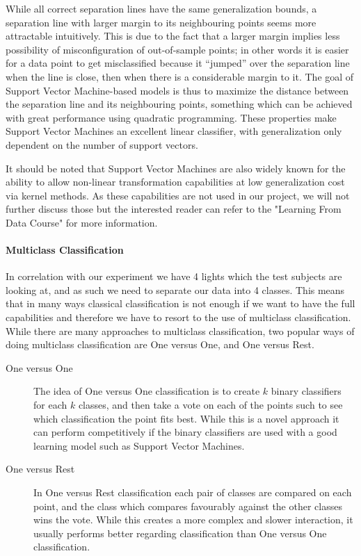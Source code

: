 While all correct separation lines have the same generalization bounds, a separation line with larger margin to its neighbouring points seems more attractable intuitively.
This is due to the fact that a larger margin implies less possibility of misconfiguration of out-of-sample points; in other words it is easier for a data point to get
misclassified because it ``jumped'' over the separation line when the line is close, then when there is a considerable margin to it.
The goal of Support Vector Machine-based models is thus to maximize the distance between the separation line and its neighbouring points,
something which can be achieved with great performance using quadratic programming\cite{learningfromdata2012course}\cite{frank2006algorithm}. 
These properties make Support Vector Machines an excellent linear classifier, with generalization only dependent on the number of support vectors.

It should be noted that Support Vector Machines are also widely known for the ability
to allow non-linear transformation capabilities at low generalization cost via kernel methods. As these capabilities are not used in our project, we will not further
discuss those but the interested reader can refer to the "Learning From Data Course"\cite{learningfromdata2012course} for more information.

\paragraph{Multiclass Classification}
\label{par:MulticlassClassification}
In correlation with our experiment we have 4 lights which the test subjects are looking at, and as such we need to separate our data into 4 classes.
This means that in many ways classical classification is not enough if we want to have the full capabilities and therefore we have to resort to the use
of multiclass classification. While there are many approaches to multiclass classification,
two popular ways of doing multiclass classification are One versus One, and One versus Rest\cite{aly2005survey}\cite{scikitlearn2012multiclass}.
\begin{description}
  \item[One versus One] The idea of One versus One classification is to create $k$ binary classifiers for each $k$ classes,
    and then take a vote on each of the points such to see which classification the point fits best.
    While this is a novel approach it can perform competitively if the binary classifiers are used with a good learning model such as Support Vector Machines.
  \item[One versus Rest] In One versus Rest classification each pair of classes are compared on each point, and the class which compares favourably against the other classes
    wins the vote. While this creates a more complex and slower interaction, it usually performs better regarding classification than One versus One classification.
\end{description}

